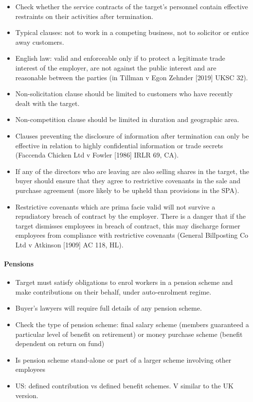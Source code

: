 \documentclass[
]{article}
\providecommand{\tightlist}{%
  \setlength{\itemsep}{0pt}\setlength{\parskip}{0pt}}
\begin{document}
\begin{itemize}
\tightlist
\item
  Check whether the service contracts of the target's personnel contain
  effective restraints on their activities after termination.
\item
  Typical clauses: not to work in a competing business, not to solicitor
  or entice away customers.
\item
  English law: valid and enforceable only if to protect a legitimate
  trade interest of the employer, are not against the public interest
  and are reasonable between the parties (in Tillman v Egon Zehnder
  {[}2019{]} UKSC 32).
\item
  Non-solicitation clause should be limited to customers who have
  recently dealt with the target.
\item
  Non-competition clause should be limited in duration and geographic
  area.
\item
  Clauses preventing the disclosure of information after termination can
  only be effective in relation to highly confidential information or
  trade secrets (Faccenda Chicken Ltd v Fowler {[}1986{]} IRLR 69, CA).
\item
  If any of the directors who are leaving are also selling shares in the
  target, the buyer should ensure that they agree to restrictive
  covenants in the sale and purchase agreement (more likely to be upheld
  than provisions in the SPA).
\item
  Restrictive covenants which are prima facie valid will not survive a
  repudiatory breach of contract by the employer. There is a danger that
  if the target dismisses employees in breach of contract, this may
  discharge former employees from compliance with restrictive covenants
  (General Billposting Co Ltd v Atkinson {[}1909{]} AC 118, HL).
\end{itemize}

\hypertarget{pensions}{%
\paragraph{Pensions}\label{pensions}}

\begin{itemize}
\tightlist
\item
  Target must satisfy obligations to enrol workers in a pension scheme
  and make contributions on their behalf, under auto-enrolment regime.
\item
  Buyer's lawyers will require full details of any pension scheme.
\item
  Check the type of pension scheme: final salary scheme (members
  guaranteed a particular level of benefit on retirement) or money
  purchase scheme (benefit dependent on return on fund)
\item
  Is pension scheme stand-alone or part of a larger scheme involving
  other employees
\item
  US: defined contribution vs defined benefit schemes. V similar to the
  UK version.
\end{itemize}
\end{document}
